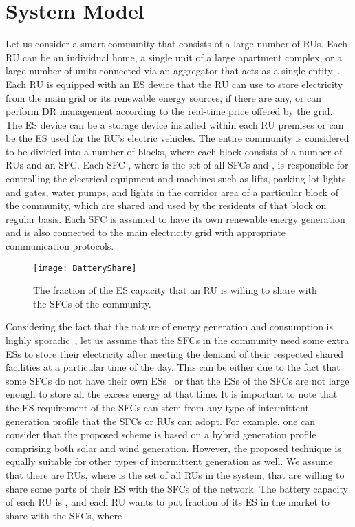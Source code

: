 \documentclass[journal,10pt]{IEEEtran}
\begin{document}
\section{System Model}\label{sec:system-model}
Let us consider a smart community that consists of a large number of RUs. Each RU can be an individual home, a single unit of a large apartment complex, or a large number of units connected via an aggregator that acts as a single entity~\cite{Gkatzikis:2013,Wayes-J-TSG:2012,Tushar-TSG:2013}. Each RU is equipped with an ES device that the RU can use to store electricity from the main grid or its renewable energy sources, if there are any, or can perform DR management according to the real-time price offered by the grid. The ES device can be a storage device installed within each RU premises or can be the ES used for the RU's electric vehicles. The entire community is considered to be divided into a number of blocks, where each block consists of a number of RUs and an SFC. Each SFC , where  is the set of all SFCs and , is responsible for controlling the electrical equipment and machines such as lifts, parking lot lights and gates, water pumps, and lights in the corridor area of a particular block of the community, which are shared and used by the residents of that block on regular basis. Each SFC is assumed to have its own renewable energy generation and is also connected to the main electricity grid with appropriate communication protocols.
\begin{figure}[t!]
\centering
\texttt{[image: BatteryShare]}
\caption{The fraction of the ES capacity that an RU  is willing to share with the SFCs of the community.} \label{fig:batteryshare}
\end{figure}

Considering the fact that the nature of energy generation and consumption is highly sporadic~\cite{Saad-CSmartgridComm:2011}, let us assume that the SFCs in the community need some extra ESs to store their electricity after meeting the demand of their respected shared facilities at a particular time of the day. This can be either due to the fact that some SFCs do not have their own ESs~\cite{Tushar-TIE:2014} or that the ESs of the SFCs are not large enough to store all the excess energy at that time. It is important to note that the ES requirement of the SFCs can stem from any type of intermittent generation profile that the SFCs or RUs can adopt. For example, one can consider that the proposed scheme is based on a hybrid generation profile comprising both solar and wind generation. However, the proposed technique is equally suitable for other types of intermittent generation as well. We assume that there are  RUs, where  is the set of all RUs in the system, that are willing to share some parts of their ES with the SFCs of the network. The battery capacity of each RU  is , and each RU  wants to put  fraction of its ES in the market to share with the SFCs, where
\end{document}
